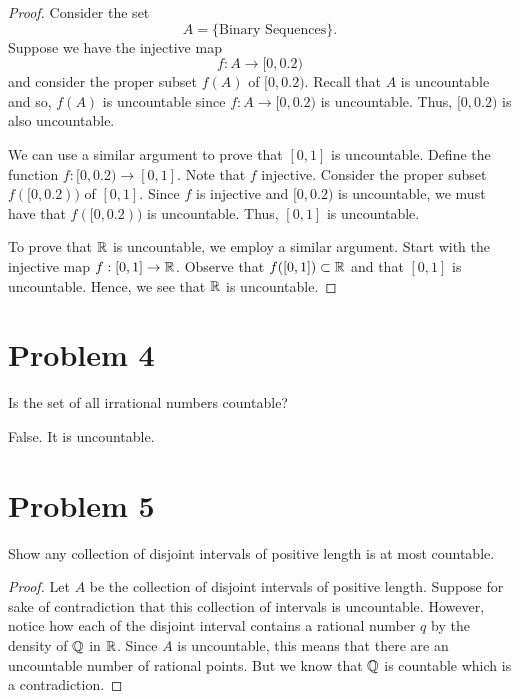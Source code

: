 \documentclass[11pt,a4paper]{article}
\begin{document}
\begin{proof}
Consider the set
\[ A = \{ \text{Binary Sequences} \}. \]
Suppose we have the injective map  
\[  f: A   \to [0,0.2) \]
and consider the proper subset \( f(A)  \) of \( [0,0.2) \). Recall that \( A  \) is uncountable and so, \( f(A)  \) is uncountable since \( f: A \to [0,0.2) \) is uncountable. Thus, \( [0,0.2) \) is also uncountable. 


We can use a similar argument to prove that \( [0,1] \) is uncountable. Define the function \( f: [0,0.2) \to [0,1] \). Note that \( f  \) injective. Consider the proper subset \( f([0,0.2))  \) of \( [0,1] \). Since \( f  \) is injective and \( [0,0.2) \) is uncountable, we must have that \( f([0,0.2)) \) is uncountable. Thus, \( [0,1] \) is uncountable.

To prove that \( \mathbb{R}  \) is uncountable, we employ a similar argument. Start with the injective map \( f : [0,1] \to \mathbb{R}  \). Observe that \( f([0,1]) \subset \mathbb{R}  \) and that \( [0,1] \) is uncountable. Hence, we see that \( \mathbb{R}  \) is uncountable.  
\end{proof}

\section*{Problem 4} Is the set of all irrational numbers countable?
\begin{solution}
False. It is uncountable.
\end{solution}

\section*{Problem 5} Show any collection of disjoint intervals of positive length is at most countable.
\begin{proof}
Let \( A  \) be the collection of disjoint intervals of positive length. Suppose for sake of contradiction that this collection of intervals is uncountable. However, notice how each of the disjoint interval contains a rational number \( q  \) by the density of \( \mathbb{Q}  \) in \( \mathbb{R} \). Since \( A  \) is uncountable, this means that there are an uncountable number of rational points. But we know that \( \mathbb{Q}  \) is countable which is a contradiction.
\end{proof}
\end{document}
